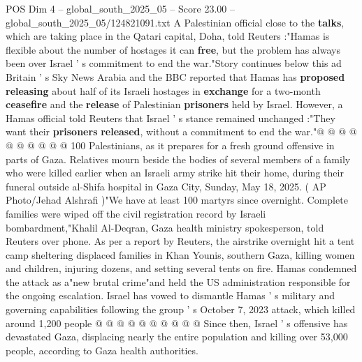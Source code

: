 \begin{textsample}{POS Dim 4 – global\_south\_2025\_05 – Score 23.00 – global\_south\_2025\_05/124821091.txt}
A Palestinian official close to the \textbf{talks}, which are taking place in the Qatari capital, Doha, told Reuters :"Hamas is flexible about the number of hostages it can \textbf{free}, but the problem has always been over Israel ' s commitment to end the war."Story continues below this ad Britain ' s Sky News Arabia and the BBC reported that Hamas has \textbf{proposed} \textbf{releasing} about half of its Israeli hostages in \textbf{exchange} for a two-month \textbf{ceasefire} and the \textbf{release} of Palestinian \textbf{prisoners} held by Israel.
However, a Hamas official told Reuters that Israel ' s stance remained unchanged :"They want their \textbf{prisoners} \textbf{released}, without a commitment to end the war."@ @ @ @ @ @ @ @ @ @ 100 Palestinians, as it prepares for a fresh ground offensive in parts of Gaza.
Relatives mourn beside the bodies of several members of a family who were killed earlier when an Israeli army strike hit their home, during their funeral outside al-Shifa hospital in Gaza City, Sunday, May 18, 2025. ( AP Photo/Jehad Alshrafi )"We have at least 100 martyrs since overnight.
Complete families were wiped off the civil registration record by Israeli bombardment,"Khalil Al-Deqran, Gaza health ministry spokesperson, told Reuters over phone.
As per a report by Reuters, the airstrike overnight hit a tent camp sheltering displaced families in Khan Younis, southern Gaza, killing women and children, injuring dozens, and setting several tents on fire.
Hamas condemned the attack as a"new brutal crime"and held the US administration responsible for the ongoing escalation.
Israel has vowed to dismantle Hamas ' s military and governing capabilities following the group ' s October 7, 2023 attack, which killed around 1,200 people @ @ @ @ @ @ @ @ @ @ Since then, Israel ' s offensive has devastated Gaza, displacing nearly the entire population and killing over 53,000 people, according to Gaza health authorities.

\end{textsample}

